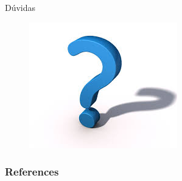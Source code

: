 \documentclass[t,14pt,mathserif]{beamer}
\begin{document}
\begin{frame}{Dúvidas}

\begin{figure}[htbp]
\centering
\includegraphics[width=.80\textwidth]{../img/questions.jpg}
\label{fig:questoes}
\end{figure}	

\end{frame}

\begin{frame}[allowframebreaks]
   \frametitle{References}
   
   
\end{frame}
\end{document}
